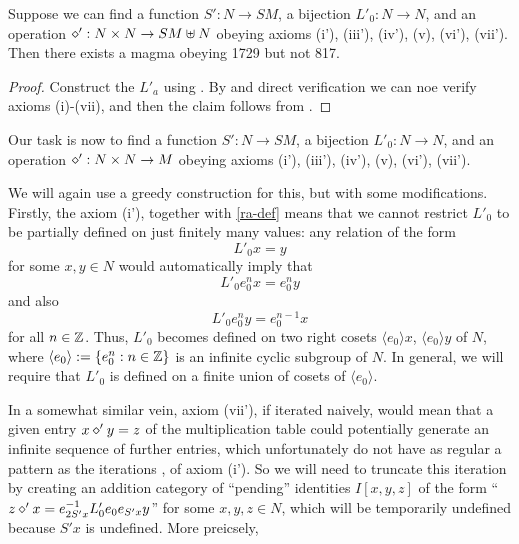 \begin{lemma}\label{axiom-reduce}  Suppose we can find a function $S': N \to SM$, a bijection $L'_0: N \to N$, and an operation $\diamond': N \times N \to SM \uplus N$ obeying axioms (i'), (iii'), (iv'), (v), (vi'), (vii').  Then there exists a magma obeying 1729 but not 817.
\end{lemma}

\begin{proof}  Construct the $L'_a$ using .  By  and direct verification we can noe verify axioms (i)-(vii), and then the claim follows from .
\end{proof}

Our task is now to find a function $S': N \to SM$, a bijection $L'_0: N \to N$, and an operation $\diamond': N \times N \to M$ obeying axioms (i'), (iii'), (iv'), (v), (vi'), (vii').

We will again use a greedy construction for this, but with some modifications.  Firstly, the axiom (i'), together with \eqref{ra-def} means that we cannot restrict $L'_0$ to be partially defined on just finitely many values: any relation of the form
$$ L'_0 x = y$$
for some $x,y \in N$ would automatically imply that
\begin{equation}\label{itero}
 L'_0 e_0^n x = e_0^n y
\end{equation}
and also
\begin{equation}\label{itero-2}
  L'_0 e_0^n y = e_0^{n-1} x
\end{equation}
for all $n \in \mathbb{Z}$.  Thus, $L'_0$ becomes defined on two right cosets $\langle e_0 \rangle x$, $\langle e_0 \rangle y$ of $N$, where $\langle e_0 \rangle := \{ e_0^n: n \in \mathbb{Z}\}$ is an infinite cyclic subgroup of $N$.  In general, we will require that $L'_0$ is defined on a finite union of cosets of $\langle e_0\rangle$.

In a somewhat similar vein, axiom (vii'), if iterated naively, would mean that a given entry $x \diamond' y = z$ of the multiplication table could potentially generate an infinite sequence of further entries, which unfortunately do not have as regular a pattern as the iterations ,  of axiom (i').  So we will need to truncate this iteration by creating an addition category of ``pending'' identities $I[x,y,z]$ of the form ``$z \diamond' x = e_{2S'x}^{-1} L'_0 e_0 e_{S'x} y$'' for some $x,y,z \in N$, which will be temporarily undefined because $S'x$ is undefined. More preicsely,

